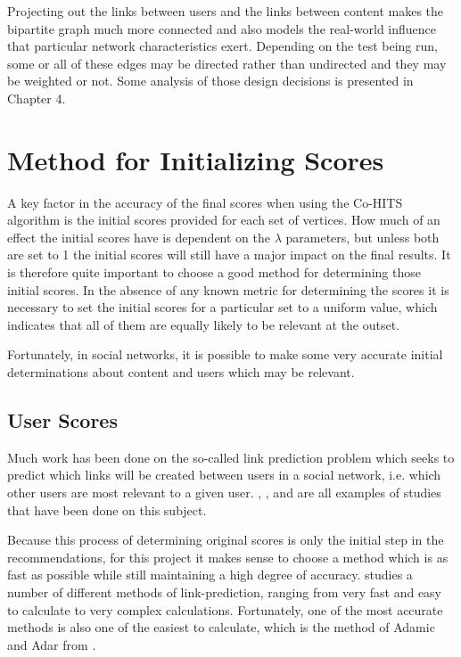 Projecting out the links between users and the links between content makes the bipartite graph much more connected and also models the real-world influence that particular network characteristics exert. Depending on the test being run, some or all of these edges may be directed rather than undirected and they may be weighted or not. Some analysis of those design decisions is presented in Chapter 4.


\section{Method for Initializing Scores}
\label{sec:InitializationOfScores}

A key factor in the accuracy of the final scores when using the Co-HITS algorithm is the initial scores provided for each set of vertices. How much of an effect the initial scores have is dependent on the $\lambda$ parameters, but unless both are set to 1 the initial scores will still have a major impact on the final results. It is therefore quite important to choose a good method for determining those initial scores. In the absence of any known metric for determining the scores it is necessary to set the initial scores for a particular set to a uniform value, which indicates that all of them are equally likely to be relevant at the outset.

Fortunately, in social networks, it is possible to make some very accurate initial determinations about content and users which may be relevant.

\subsection{User Scores}
\label{sec:InitializationOfUserScores}

Much work has been done on the so-called link prediction problem which seeks to predict which links will be created between users in a social network, i.e. which other users are most relevant to a given user. \cite{LibenNowell2007}, \cite{Kunegis2010}, and \cite{Backstrom2011} are all examples of studies that have been done on this subject.

Because this process of determining original scores is only the initial step in the recommendations, for this project it makes sense to choose a method which is as fast as possible while still maintaining a high degree of accuracy. \cite{LibenNowell2007} studies a number of different methods of link-prediction, ranging from very fast and easy to calculate to very complex calculations. Fortunately, one of the most accurate methods is also one of the easiest to calculate, which is the method of Adamic and Adar from \cite{Adamic2003}.

